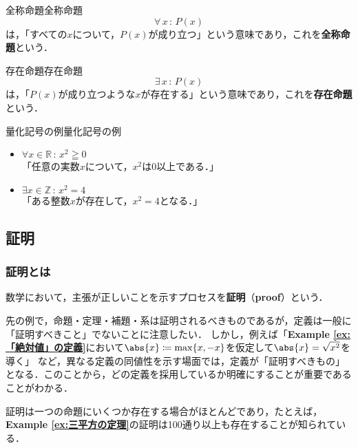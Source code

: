 \documentclass[a4paper,11pt]{ltjsarticle}
\renewcommand{\emph}[1]{\textbf{#1}}
\newcommand{\exref}[1]{{\bfseries\sffamily Example \ref{ex:#1}}}
\renewcommand{\geq}{\geqq}
\begin{document}
    \begin{definition}{全称命題}{全称命題}
        \[
          \forall\, x \, : \, P(x)
        \]
        は，「すべての$x$について，$P(x)$が成り立つ」という意味であり，これを\emph{全称命題}という．
    \end{definition}
    
    \begin{definition}{存在命題}{存在命題}
        \[
        \exists \,  x\, : \, P(x)
        \]
        は，「$P(x)$が成り立つような$x$が存在する」という意味であり，これを\emph{存在命題}という．
    \end{definition}
    
    \begin{example}{量化記号の例}{量化記号の例}
        \begin{itemize}
            \item $\forall x \in \mathbb{R}\, : \, x^2 \geq 0$\\
            「任意の実数$x$について，$x^2$は$0$以上である．」
            \item $\exists x \in \mathbb{Z} \, : \, x^2 = 4$\\
            「ある整数$x$が存在して，$x^2 = 4$となる．」
        \end{itemize}
    \end{example}

    \subsection{証明}

    \subsubsection{証明とは}
    数学において，主張が正しいことを示すプロセスを\emph{証明}（\emph{proof}）という．
    
    先の例で，命題・定理・補題・系は証明されるべきものであるが，定義は一般に「証明すべきこと」でないことに注意したい．
    しかし，例えば「\exref{「絶対値」の定義}において$\abs{x} \coloneqq \max \{ x, -x \}$を仮定して$\abs{x} = \sqrt{x^2}$を導く」
    など，異なる定義の同値性を示す場面では，定義が「証明すべきもの」となる．このことから，どの定義を採用しているか明確にすることが重要であることがわかる．

    証明は一つの命題にいくつか存在する場合がほとんどであり，たとえば，\exref{三平方の定理}の証明は100通り以上も存在することが知られている．
    
\end{document}
